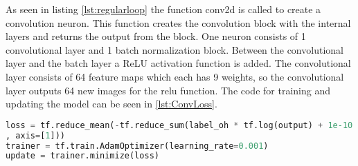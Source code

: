 As seen in listing \ref{lst:regularloop} the function conv2d is called to create a convolution neuron. This function creates the convolution block with the internal layers and returns the output from the block. One neuron consists of 1 convolutional layer and 1 batch normalization block. Between the convolutional layer and the batch layer a ReLU activation function is added. The convolutional layer consists of 64 feature maps which each has 9 weights, so the convolutional layer outputs 64 new images for the relu function. The code for training and updating the model can be seen in \ref{lst:ConvLoss}.

\begin{lstlisting}[language=Python, label=lst:ConvLoss, caption= Implementation of learning rate type ADAM]
loss = tf.reduce_mean(-tf.reduce_sum(label_oh * tf.log(output) + 1e-10
, axis=[1]))
trainer = tf.train.AdamOptimizer(learning_rate=0.001)
update = trainer.minimize(loss)
\end{lstlisting}